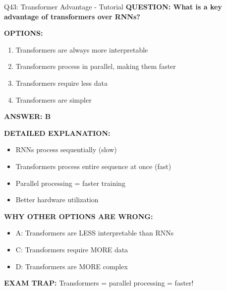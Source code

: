 \documentclass[8pt]{beamer}
\begin{document}
	\begin{frame}{Q43: Transformer Advantage - Tutorial}
		\fontsize{6.5}{7.5}\selectfont
		\textbf{QUESTION: What is a key advantage of transformers over RNNs?}
		
		\vspace{0.1cm}
		\textbf{OPTIONS:}
		\begin{enumerate}
			\item Transformers are always more interpretable
			\item Transformers process in parallel, making them faster
			\item Transformers require less data
			\item Transformers are simpler
		\end{enumerate}
		
		\vspace{0.1cm}
		\textcolor{myblue}{\textbf{ANSWER: B}}
		
		\vspace{0.1cm}
		\textbf{DETAILED EXPLANATION:}
		\begin{itemize}
			\item RNNs process sequentially (slow)
			\item Transformers process entire sequence at once (fast)
			\item Parallel processing = faster training
			\item Better hardware utilization
		\end{itemize}
		
		\vspace{0.1cm}
		\textcolor{myred}{\textbf{WHY OTHER OPTIONS ARE WRONG:}}
		\begin{itemize}
			\item \textcolor{myred}{A:} Transformers are LESS interpretable than RNNs
			\item \textcolor{myred}{C:} Transformers require MORE data
			\item \textcolor{myred}{D:} Transformers are MORE complex
		\end{itemize}
		
		\textcolor{myred}{\textbf{EXAM TRAP:}} Transformers = \textcolor{myblue}{parallel processing} = faster!
	\end{frame}
	
\end{document}
